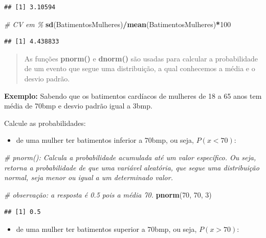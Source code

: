 \documentclass[
]{book}
\newenvironment{Shaded}{\begin{snugshade}}{\end{snugshade}}
\newcommand{\CommentTok}[1]{\textcolor[rgb]{0.56,0.35,0.01}{\textit{#1}}}
\newcommand{\DecValTok}[1]{\textcolor[rgb]{0.00,0.00,0.81}{#1}}
\newcommand{\FunctionTok}[1]{\textcolor[rgb]{0.13,0.29,0.53}{\textbf{#1}}}
\newcommand{\NormalTok}[1]{#1}
\newcommand{\SpecialCharTok}[1]{\textcolor[rgb]{0.81,0.36,0.00}{\textbf{#1}}}
\providecommand{\tightlist}{%
  \setlength{\itemsep}{0pt}\setlength{\parskip}{0pt}}
\begin{document}
\begin{verbatim}
## [1] 3.10594
\end{verbatim}

\begin{Shaded}
\begin{Highlighting}[]
\CommentTok{\# CV em \%}
\FunctionTok{sd}\NormalTok{(BatimentosMulheres)}\SpecialCharTok{/}\FunctionTok{mean}\NormalTok{(BatimentosMulheres)}\SpecialCharTok{*}\DecValTok{100}
\end{Highlighting}
\end{Shaded}

\begin{verbatim}
## [1] 4.438833
\end{verbatim}

\begin{quote}
As funções \textbf{pnorm()} e \textbf{dnorm()} são usadas para calcular a probabilidade de um evento que segue uma distribuição, a qual conhecemos a média e o desvio padrão.
\end{quote}

\textbf{Exemplo:} Sabendo que os batimentos cardíacos de mulheres de 18 a 65 anos tem média de 70bmp e desvio padrão igual a 3bmp.

Calcule as probabilidades:

\begin{itemize}
\tightlist
\item
  de uma mulher ter batimentos inferior a 70bmp, ou seja, \(P(x<70)\):
\end{itemize}

\begin{Shaded}
\begin{Highlighting}[]
\CommentTok{\# pnorm(): Calcula a probabilidade acumulada até um valor específico. Ou seja, retorna a probabilidade de que uma variável aleatória, que segue uma distribuição normal, seja menor ou igual a um determinado valor.}

\CommentTok{\# observação: a resposta é 0.5 pois a média 70.}
\FunctionTok{pnorm}\NormalTok{(}\DecValTok{70}\NormalTok{, }\DecValTok{70}\NormalTok{, }\DecValTok{3}\NormalTok{)}
\end{Highlighting}
\end{Shaded}

\begin{verbatim}
## [1] 0.5
\end{verbatim}

\begin{itemize}
\tightlist
\item
  de uma mulher ter batimentos superior a 70bmp, ou seja, \(P(x>70)\):
\end{itemize}
\end{document}
